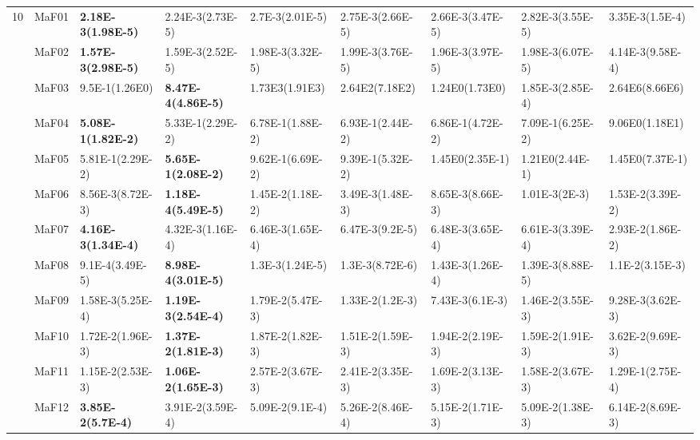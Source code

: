 \documentclass[]{article}
\begin{document}
\begin{landscape}
\begin{table}
\begin{footnotesize}
\begin{tabular}{|l|l|l|l|l|l|l|l|l|}
\multirow{15}{*}{10} & MaF01 & \cellcolor{gray95} {\bf 2.18E-3(1.98E-5)} & \cellcolor{gray95} 2.24E-3(2.73E-5) & 2.7E-3(2.01E-5) & 2.75E-3(2.66E-5) & 2.66E-3(3.47E-5) & 2.82E-3(3.55E-5) & 3.35E-3(1.5E-4)\\
 & MaF02 & \cellcolor{gray95} {\bf 1.57E-3(2.98E-5)} & \cellcolor{gray95} 1.59E-3(2.52E-5) & 1.98E-3(3.32E-5) & 1.99E-3(3.76E-5) & 1.96E-3(3.97E-5) & 1.98E-3(6.07E-5) & 4.14E-3(9.58E-4)\\
 & MaF03 & 9.5E-1(1.26E0) & \cellcolor{gray95} {\bf 8.47E-4(4.86E-5)} & 1.73E3(1.91E3) & 2.64E2(7.18E2) & 1.24E0(1.73E0) & \cellcolor{gray95} 1.85E-3(2.85E-4) & 2.64E6(8.66E6)\\
 & MaF04 & \cellcolor{gray95} {\bf 5.08E-1(1.82E-2)} & \cellcolor{gray95} 5.33E-1(2.29E-2) & 6.78E-1(1.88E-2) & 6.93E-1(2.44E-2) & 6.86E-1(4.72E-2) & 7.09E-1(6.25E-2) & 9.06E0(1.18E1)\\
 & MaF05 & \cellcolor{gray95} 5.81E-1(2.29E-2) & \cellcolor{gray95} {\bf 5.65E-1(2.08E-2)} & 9.62E-1(6.69E-2) & 9.39E-1(5.32E-2) & 1.45E0(2.35E-1) & 1.21E0(2.44E-1) & 1.45E0(7.37E-1)\\
 & MaF06 & 8.56E-3(8.72E-3) & \cellcolor{gray95} {\bf 1.18E-4(5.49E-5)} & 1.45E-2(1.18E-2) & 3.49E-3(1.48E-3) & 8.65E-3(8.66E-3) & \cellcolor{gray95} 1.01E-3(2E-3) & 1.53E-2(3.39E-2)\\
 & MaF07 & \cellcolor{gray95} {\bf 4.16E-3(1.34E-4)} & \cellcolor{gray95} 4.32E-3(1.16E-4) & 6.46E-3(1.65E-4) & 6.47E-3(9.2E-5) & 6.48E-3(3.65E-4) & 6.61E-3(3.39E-4) & 2.93E-2(1.86E-2)\\
 & MaF08 & \cellcolor{gray95} 9.1E-4(3.49E-5) & \cellcolor{gray95} {\bf 8.98E-4(3.01E-5)} & 1.3E-3(1.24E-5) & 1.3E-3(8.72E-6) & 1.43E-3(1.26E-4) & 1.39E-3(8.88E-5) & 1.1E-2(3.15E-3)\\
 & MaF09 & \cellcolor{gray95} 1.58E-3(5.25E-4) & \cellcolor{gray95} {\bf 1.19E-3(2.54E-4)} & 1.79E-2(5.47E-3) & 1.33E-2(1.2E-3) & 7.43E-3(6.1E-3) & 1.46E-2(3.55E-3) & 9.28E-3(3.62E-3)\\
 & MaF10 & 1.72E-2(1.96E-3) & \cellcolor{gray95} {\bf 1.37E-2(1.81E-3)} & 1.87E-2(1.82E-3) & \cellcolor{gray95} 1.51E-2(1.59E-3) & 1.94E-2(2.19E-3) & \cellcolor{gray95} 1.59E-2(1.91E-3) & 3.62E-2(9.69E-3)\\
 & MaF11 & \cellcolor{gray95} 1.15E-2(2.53E-3) & \cellcolor{gray95} {\bf 1.06E-2(1.65E-3)} & 2.57E-2(3.67E-3) & 2.41E-2(3.35E-3) & 1.69E-2(3.13E-3) & \cellcolor{gray95} 1.58E-2(3.67E-3) & 1.29E-1(2.75E-4)\\
 & MaF12 & \cellcolor{gray95} {\bf 3.85E-2(5.7E-4)} & \cellcolor{gray95} 3.91E-2(3.59E-4) & 5.09E-2(9.1E-4) & 5.26E-2(8.46E-4) & 5.15E-2(1.71E-3) & 5.09E-2(1.38E-3) & 6.14E-2(8.69E-3)\\

\end{tabular}
\end{footnotesize}
\end{table}
\end{landscape}
\end{document}

